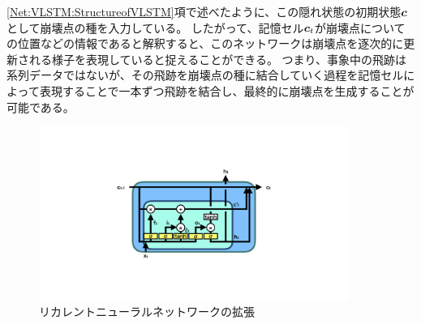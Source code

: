 \ref{Net:VLSTM:StructureofVLSTM}項で述べたように、この隠れ状態の初期状態${\mbox{\boldmath{$c$}}}$として崩壊点の種を入力している。
したがって、記憶セル${\mbox{\boldmath{$c$}}}_{t}$が崩壊点についての位置などの情報であると解釈すると、このネットワークは崩壊点を逐次的に更新される様子を表現していると捉えることができる。
つまり、事象中の飛跡は系列データではないが、その飛跡を崩壊点の種に結合していく過程を記憶セルによって表現することで一本ずつ飛跡を結合し、最終的に崩壊点を生成することが可能である。

\begin{figure}[htbp]
 \centering
 \includegraphics[trim = 200 200 200 200, width=0.9\textwidth, clip]{Figure/3Networks/3-4-2-1VLSTMStructure.png}
 \caption{リカレントニューラルネットワークの拡張}
 \label{3-4-2-1VLSTMStructure}
\end{figure}

